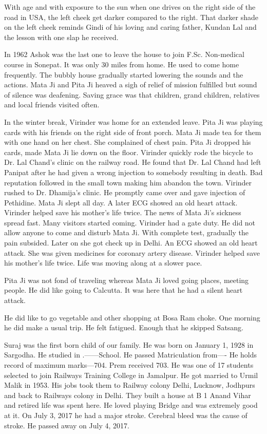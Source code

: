 With age and with exposure to the sun when one drives on the right side of the road in USA, the left cheek get darker compared to the right. That darker shade on the left cheek reminds Gindi of his loving and caring father, Kundan Lal and the lesson with one slap he received. 

In 1962 Ashok was the last one to leave the house to join F.Sc. Non-medical course in Sonepat. It was only 30 miles from home. He used to come home frequently. The bubbly house gradually started lowering the sounds and the actions. Mata Ji and Pita Ji heaved a sigh of relief of mission fulfilled but sound of silence was deafening. Saving grace was that children, grand children, relatives and local friends visited often.

In the winter break, Virinder was home for an extended leave. Pita Ji was playing cards with his friends on the right side of front porch. Mata Ji made tea for them with one hand on her chest. She complained of chest pain. Pita Ji dropped his cards, made Mata Ji lie down on the floor. Virinder quickly rode the bicycle to Dr. Lal Chand’s clinic on the railway road. He found that Dr. Lal Chand had left Panipat after he had given a wrong injection to somebody resulting in death. Bad reputation followed in the small town making him abandon the town. 
Virinder rushed to Dr. Dhamija’s clinic. He promptly came over and gave injection of Pethidine. Mata Ji slept all day. A later ECG showed an old heart attack. Virinder helped save his mother’s life twice. 
The news of Mata Ji’s sickness spread fast. Many visitors started coming. Virinder had a gate duty. He did not allow anyone to come and disturb Mata Ji. 
With complete test, gradually the pain subsided. 
Later on she got check up in Delhi. An ECG showed an old heart attack. She was given medicines for coronary artery disease. Virinder helped save his mother’s life twice.
Life was moving along at a slower pace. 

Pita Ji was not fond of traveling whereas Mata Ji loved going places, meeting people. He did like going to Calcutta. It was here that he had a silent heart attack. 

He did like to go vegetable and other shopping at Bosa Ram choke. One morning he did make a usual trip. He felt fatigued. Enough that he skipped Satsang. 

Suraj was the first born child of our family. He was born on January 1, 1928 in Sargodha. He studied in .——School. He passed Matriculation from—- He holds record of maximum marks—704. Prem received 703. He was one of 17 students selected to join Railways Training College in Jamalpur. He got married to Urmil Malik in 1953. His jobs took them to Railway colony Delhi, Lucknow, Jodhpurs and back to Railways colony in Delhi. They built a house at B 1 Anand Vihar and retired life was spent here. 
He loved playing Bridge and was extremely good at it. On July 3, 2017 he had a major stroke. Cerebral bleed was the cause of stroke. He passed away on July 4, 2017. 


